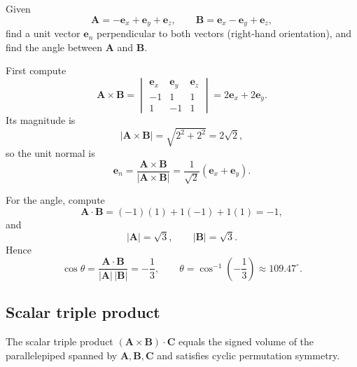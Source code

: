 \begin{example}
Given
\begin{equation}
\mathbf{A}=-\mathbf{e}_x+\mathbf{e}_y+\mathbf{e}_z,
\qquad
\mathbf{B}=\mathbf{e}_x-\mathbf{e}_y+\mathbf{e}_z,
\end{equation}
find a unit vector $\mathbf{e}_n$ perpendicular to both vectors (right-hand orientation), and find the angle between $\mathbf{A}$ and $\mathbf{B}$.

First compute
\begin{equation}
\mathbf{A}\times\mathbf{B}=\begin{vmatrix}
\mathbf{e}_x&\mathbf{e}_y&\mathbf{e}_z\\
-1&1&1\\
1&-1&1
\end{vmatrix}
=2\mathbf{e}_x+2\mathbf{e}_y.
\end{equation}
Its magnitude is
\begin{equation}
|\mathbf{A}\times\mathbf{B}|=\sqrt{2^2+2^2}=2\sqrt{2},
\end{equation}
so the unit normal is
\begin{equation}
\mathbf{e}_n=\frac{\mathbf{A}\times\mathbf{B}}{|\mathbf{A}\times\mathbf{B}|}
=\frac{1}{\sqrt{2}}\left(\mathbf{e}_x+\mathbf{e}_y\right).
\end{equation}

For the angle, compute
\begin{equation}
\mathbf{A}\cdot\mathbf{B}=(-1)(1)+1(-1)+1(1)=-1,
\end{equation}
and
\begin{equation}
|\mathbf{A}|=\sqrt{3},
\qquad
|\mathbf{B}|=\sqrt{3}.
\end{equation}
Hence
\begin{equation}
\cos\theta=\frac{\mathbf{A}\cdot\mathbf{B}}{|\mathbf{A}|\,|\mathbf{B}|}=-\frac{1}{3},
\qquad
\theta=\cos^{-1}\!\left(-\frac{1}{3}\right)\approx 109.47^\circ.
\end{equation}
\end{example}

\subsection{Scalar triple product}
The scalar triple product $(\mathbf{A}\times\mathbf{B})\cdot\mathbf{C}$ equals the signed volume of the parallelepiped spanned by $\mathbf{A},\mathbf{B},\mathbf{C}$ and satisfies cyclic permutation symmetry.

